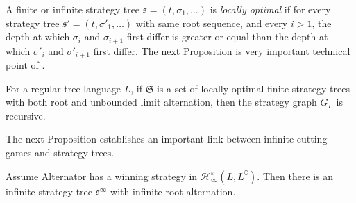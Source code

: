 A finite or infinite strategy tree $\mathfrak{s}=(t, \sigma_1, \dots)$ is \emph{locally optimal} if for every strategy tree $\mathfrak{s}'=(t, \sigma'_1, \dots)$ with same root sequence, and every $i>1$, the depth at which $\sigma_i$ and $\sigma_{i+1}$ first differ is greater or equal than the depth at which $\sigma'_i$ and $\sigma'_{i+1}$ first differ.
The next Proposition is very important technical point of \cite{bp}. 
\begin{proposition}[\cite{bp}]\label{prop:locality}
 For a regular tree language $L$, if $\mathfrak{S}$ is a set of locally optimal finite strategy trees with both root and unbounded limit alternation, then the strategy graph $G_L$ is recursive.
 \end{proposition}
The next Proposition establishes an important link between infinite cutting games and strategy trees. %
\begin{proposition}\label{prop:types}
 Assume Alternator has a winning strategy in  $\mathcal{H}^\varepsilon_\infty(L, L^\complement)$. Then there is an infinite strategy tree $\mathfrak{s}^\infty$ with infinite root alternation. 
\end{proposition} 
